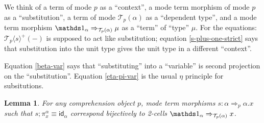 \documentclass[10pt]{article}
\newtheorem{lemma}{Lemma}
\theoremstyle{definition}
\newcommand{\Yields}{\tcell}
\newcommand{\tcell}{\Rightarrow}
\newcommand{\id}{\mathsf{id}}
\newcommand\TrPlus[2]{\ensuremath{{#1}^+(#2)}}
\newcommand\El[2]{\mathcal{T}_{#1}(#2)}
\newcommand\ApEl[2]{\mathcal{T}_{#1}\langle#2\rangle}
\begin{document}
We think of a term of mode $p$ as a ``context'', a mode term morphism of
mode $p$ as a ``substitution'', a term of mode $\El{p}{\alpha}$ as a
``dependent type'', and a mode term morphism $\One_\alpha
\Yields_{\El{p}{\alpha}} \mu$ as a ``term'' of ``type'' $\mu$.  For the
equations: $\TrPlus{\ApEl{p}{s}}{-}$ is supposed to act like
substitution; equation \eqref{s-plus-one-strict} says that substitution
into the unit type gives the unit type in a different ``context''.

Equation \eqref{beta-var} says that ``substituting'' into a ``variable'' is second projection on the ``substitution''.  Equation \eqref{eta-pi-var} is the usual $\eta$ principle for subsitutions.

\begin{lemma}\label{sigma:total-to-fiber0} 
For any comprehension object $p$, mode term morphisms $s : \alpha \tcell_p \alpha.x$ such that $s;\pi^\alpha_x \equiv \id_\alpha$ correspond bijectively to 2-cells $\One_\alpha \tcell_{\El{p}{\alpha}} x$.
\end{lemma}
\end{document}
